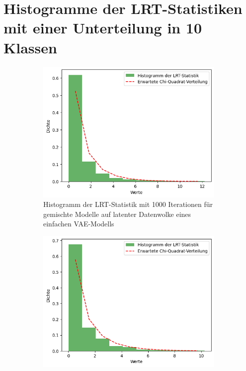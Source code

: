 \documentclass[%
thesis=student,%
coverpage=false,%
titlepage=false,%
headmarks=true, %
german,%
font=libertine, %
math=newpxtx, %
BCOR=5mm,%
coverBCOR=11mm%
]{tumbook}
\theoremstyle{break}
\begin{document}
\section{Histogramme der LRT-Statistiken mit einer Unterteilung in 10 Klassen}
\begin{figure}
	\centering
	\begin{subfigure}[b]{0.45\textwidth}
		\centering
		\includegraphics[width=\textwidth]{plots/1_latent_dim_VAE_10bins.png}
		\caption{Histogramm der LRT-Statistik mit 1000 Iterationen für gemischte Modelle auf latenter Datenwolke eines einfachen VAE-Modells}
		\label{fig:HIST_1latent_dim_10bins}
	\end{subfigure}
	\hfill
	\begin{subfigure}[b]{0.45\textwidth}
		\centering
		\includegraphics[width=\textwidth]{plots/Autoencoder_10bins.png}

\end{subfigure}
\end{figure}
\end{document}
